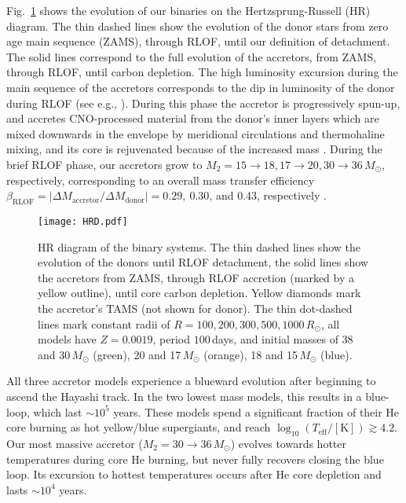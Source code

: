 \documentclass[twocolumn,twocolappendix,trackchanges]{aastex63}
\DeclareRobustCommand{\Figref}[1]{Fig.~\ref{#1}}
\begin{document}
\Figref{fig:HRD} shows the evolution of our binaries on the
Hertzsprung-Russell (HR) diagram. The thin dashed lines %
show the evolution of the donor stars \citep[see also,
e.g.,][]{gotberg:2017, laplace:2021} from zero age main sequence (ZAMS), through RLOF, until our definition of
detachment. The solid lines correspond to the full evolution of the
accretors, from ZAMS, through RLOF, until
carbon depletion. The high luminosity excursion during the main
sequence of the accretors corresponds to the dip in luminosity of the
donor during RLOF (see e.g., \citealt{renzo:2021zoph}). During this phase the accretor is progressively
spun-up, and accretes CNO-processed material from the donor's inner
layers which are mixed downwards in the envelope by meridional
circulations and thermohaline mixing, and its core is rejuvenated
because of the increased mass \citep[see also][]{sravan:2019,
  renzo:2021zoph, wang:2020}. During the brief RLOF phase, our
accretors grow to
$M_2=15\rightarrow 18, 17\rightarrow 20, 30\rightarrow 36\,M_\odot$,
respectively, corresponding to an overall mass transfer efficiency
$\beta_\mathrm{RLOF}=|\Delta M_\mathrm{accretor}/\Delta M_\mathrm{donor}| = 0.29,\ 0.30,$\,and
0.43, respectively
\citep[see discussion in ][]{renzo:2021zoph}.

\begin{figure}[tbp]
  \texttt{[image: HRD.pdf]}
  \caption{HR diagram of the binary systems. The thin dashed lines
    show the evolution of the donors until RLOF detachment, the solid
    lines show the accretors from ZAMS, through RLOF accretion (marked
    by a yellow outline), until
    core carbon depletion. Yellow diamonds mark the accretor's TAMS
    (not shown for donor). The thin dot-dashed lines mark constant radii
    of $R=100, 200, 300, 500, 1000\,R_\odot$, all models have
    $Z=0.0019$, period $100$\,days, and initial masses of 38 and
    30\,$M_\odot$ (green), 20 and 17\,$M_\odot$ (orange), 18 and
    15\,$M_\odot$ (blue).}
  \label{fig:HRD}
\end{figure}

All three accretor models experience a blueward evolution after
beginning to ascend the Hayashi track. In the two lowest mass models,
this results in a blue-loop, which last $\sim{}10^5$ years. These
models spend a significant fraction of their He core burning as hot
yellow/blue supergiants, and reach
$\log_{10}(T_\mathrm{eff}/\mathrm{[K]})\gtrsim 4.2$. Our most massive
  accretor ($M_2=30\rightarrow 36\,M_\odot$) evolves towards hotter temperatures
  during core He burning, but never fully recovers closing the blue
  loop. Its excursion to hottest temperatures occurs after He core
  depletion and lasts $\sim{}10^{4}$ years.
\end{document}
